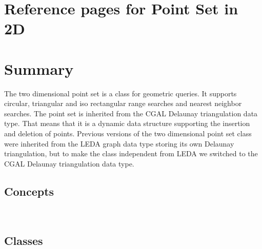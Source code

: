 

\ccParDims

\clearpage
\section{Reference pages for Point Set in 2D}

\section*{Summary}

The two dimensional point set is a class for geometric queries.
It supports circular, triangular and iso rectangular range searches and
nearest neighbor searches.
The point set is inherited from the CGAL Delaunay triangulation data type.
That means that it is a dynamic data structure supporting the insertion and
deletion of points. Previous versions of the two dimensional point set class
were inherited from the LEDA graph data type storing its own Delaunay triangulation,
but to make the class independent from LEDA we switched to the 
CGAL Delaunay triangulation data type.

\subsection*{Concepts}
\\

\subsection*{Classes}
\\
\\

